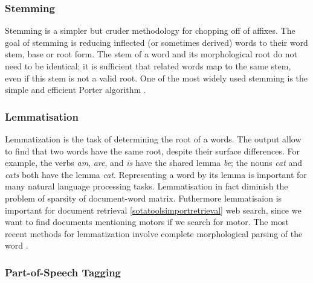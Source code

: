 \documentclass[]{book}
\begin{document}
\subsubsection{Stemming}\label{sotatoolstransformstemming}

Stemming is a simpler but cruder methodology for chopping off of
affixes. The goal of stemming is reducing inflected (or sometimes
derived) words to their word stem, base or root form. The stem of a word
and its morphological root do not need to be identical; it is sufficient
that related words map to the same stem, even if this stem is not a
valid root. One of the most widely used stemming is the simple and
efficient Porter algorithm \citep{porter1980algorithm}.

\subsubsection{Lemmatisation}\label{sotatoolstransformlemmatisation}

Lemmatization is the task of determining the root of a words. The output
allow to find that two words have the same root, despite their surface
differences. For example, the verbs \emph{am}, \emph{are}, and \emph{is}
have the shared lemma \emph{be}; the nouns \emph{cat} and \emph{cats}
both have the lemma \emph{cat}. Representing a word by its lemma is
important for many natural language processing tasks. Lemmatisation in
fact diminish the problem of sparsity of document-word matrix.
Futhermore lemmatisaion is important for document retrieval
\ref{sotatoolsimportretrieval} web search, since we want to find
documents mentioning motors if we search for motor. The most recent
methods for lemmatization involve complete morphological parsing of the
word \citep{hankamer1989morphological}.

\subsubsection{Part-of-Speech Tagging}\label{sotatoolstransformpos}
\end{document}
